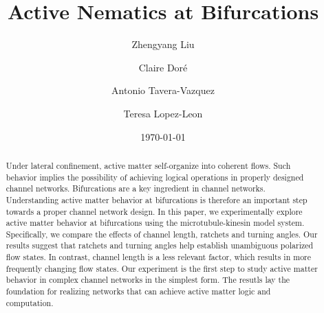 \documentclass[%
10pt,
superscriptaddress,
twocolumn,
 amsmath,amssymb,
 aps,prx,
]{revtex4-2}
\begin{document}

\title{Active Nematics at Bifurcations}%



\author{Zhengyang Liu}
\author{Claire Doré}

\author{Antonio Tavera-Vazquez}

\author{Teresa Lopez-Leon}
\date{\today}




\begin{abstract}

Under lateral confinement, active matter self-organize into coherent flows. 
Such behavior implies the possibility of achieving logical operations in properly designed channel networks. 
Bifurcations are a key ingredient in channel networks.
Understanding active matter behavior at bifurcations is therefore an important step towards a proper channel network design.
In this paper, we experimentally explore active matter behavior at bifurcations using the microtubule-kinesin model system. 
Specifically, we compare the effects of channel length, ratchets and turning angles. 
Our results suggest that ratchets and turning angles help establish unambiguous polarized flow states.
In contrast, channel length is a less relevant factor, which results in more frequently changing flow states.
Our experiment is the first step to study active matter behavior in complex channel networks in the simplest form.
The resutls lay the foundation for realizing networks that can achieve active matter logic and computation.

\end{abstract}

\maketitle
\end{document}
